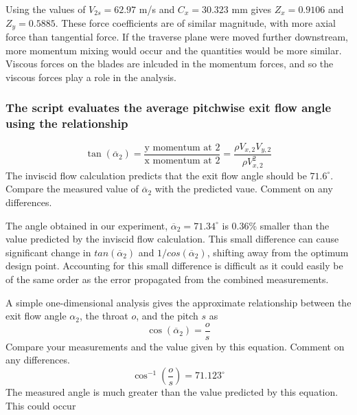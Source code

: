 \documentclass{article}
\begin{document}
Using the values of $V_{2s} = 62.97$ m/s and $C_x = 30.323$ mm gives $Z_x = 0.9106$ and $Z_y = 0.5885$.
These force coefficients are of similar magnitude, with more axial force than tangential force.
If the traverse plane were moved further downstream, more momentum mixing would occur and the quantities would be more similar.
Viscous forces on the blades are inlcuded in the momentum forces, and so the viscous forces play a role in the analysis.

\subsubsection{The script evaluates the average pitchwise exit flow angle using the relationship
}
\begin{equation}
    \tan (\overline{\alpha}_2) = \frac{\text{y momentum at 2}}{\text{x momentum at 2}} = \frac{\rho V_{x,2}V_{y,2}}{\rho V_{x,2}^2} \label{eq:alpha2}
\end{equation}
The inviscid flow calculation predicts that the exit flow angle should be $71.6^\circ$. Compare the
measured value of $\overline{\alpha}_2$ with the predicted vaue. Comment on any differences.

The angle obtained in our experiment, $\overline{\alpha}_2 = 71.34^\circ$ is 0.36\% smaller than the value predicted by the inviscid flow calculation.
This small difference can cause significant change in $tan(\overline{\alpha}_2)$ and $1/cos(\overline{\alpha}_2)$, shifting away from the optimum design point.
Accounting for this small difference is difficult as it could easily be of the same order as the error propagated from the combined measurements.

% 


A simple one-dimensional analysis gives the approximate relationship between the exit flow angle $\alpha_2$, the throat $o$, and the pitch $s$ as
\begin{equation}
    \cos (\overline{\alpha}_2) = \frac{o}{s}
\end{equation}
Compare your measurements and the value given by this equation. Comment on any
differences.
\begin{equation}
    \cos^{-1}\left( \frac{o}{s} \right) = 71.123^\circ
\end{equation}
The measured angle is much greater than the value predicted by this equation.
This could occur 
\end{document}
